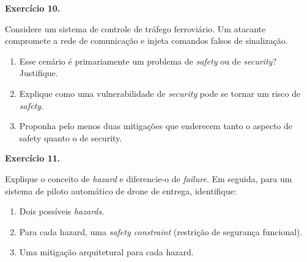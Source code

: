 \documentclass[12pt,a4paper]{article}
\newif\ifgabarito
\newcommand{\questao}[2][8]{%
  \needspace{#1\baselineskip}%
  \noindent\textbf{Exercício #2.}%
}
\begin{document}
\vspace{8pt}

\questao[8]{10}
Considere um sistema de controle de tráfego ferroviário. Um atacante compromete a rede de comunicação e injeta comandos falsos de sinalização.
\begin{enumerate}[label=\alph*)]
  \item Esse cenário é primariamente um problema de \textit{safety} ou de \textit{security}? Justifique.
  \item Explique como uma vulnerabilidade de \textit{security} pode se tornar um risco de \textit{safety}.
  \item Proponha pelo menos duas mitigações que enderecem tanto o aspecto de safety quanto o de security.
\end{enumerate}

\ifgabarito
\begin{tcolorbox}[gabarito]
\begin{enumerate}[label=\alph*),nosep]
  \item Primariamente \textbf{security} (ameaça intencional de um atacante), com consequência direta de \textbf{safety} (risco de colisão ou descarrilamento).
  \item A vulnerabilidade de security permite injeção de comandos falsos; o sistema de controle recebe informações incorretas, o que leva a uma decisão errada de sinalização e, em seguida, ao acidente físico.
  \item Autenticação mútua entre nós de sinalização (certificados digitais) + watchdog de segurança independente que valida coerência dos comandos recebidos em relação ao estado físico dos trilhos.
\end{enumerate}
\end{tcolorbox}
\fi

\vspace{8pt}

\questao[9]{11}
Explique o conceito de \textit{hazard} e diferencie-o de \textit{failure}. Em seguida, para um sistema de piloto automático de drone de entrega, identifique:
\begin{enumerate}[label=\alph*)]
  \item Dois possíveis \textit{hazards}.
  \item Para cada hazard, uma \textit{safety constraint} (restrição de segurança funcional).
  \item Uma mitigação arquitetural para cada hazard.
\end{enumerate}
\end{document}
